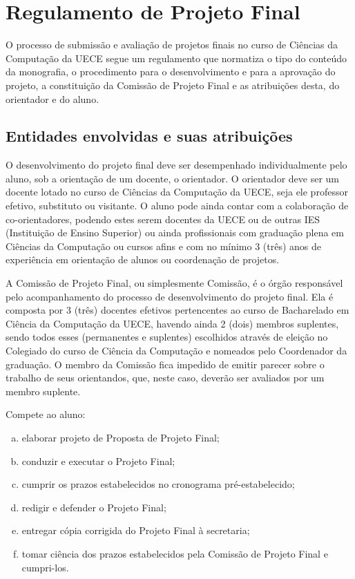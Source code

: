 \chapter{Regulamento de Projeto Final}
\label{cha:regulamento}

O processo de submissão e avaliação de projetos finais no curso
de Ciências da Computa\-ção da UECE segue um regulamento que normatiza 
o tipo do conteúdo da monografia, o procedimento para o desenvolvimento 
e para a aprovação do projeto, a constituição da Comissão de Projeto 
Final e as atribuições desta, do orientador e do aluno. 

\section{Entidades envolvidas e suas atribuições}
O desenvolvimento do projeto final deve ser desempenhado individualmente
pelo aluno, sob a orientação de um docente, o orientador. O orientador deve
ser um docente lotado no curso de Ciências da Computação da UECE, seja ele
professor efetivo, substituto ou visitante. O aluno pode ainda contar com a
colaboração de co-orientadores, podendo estes serem docentes da UECE ou de 
outras IES (Instituição de Ensino Superior) ou ainda profissionais com graduação
plena em Ciências da Computação ou cursos afins e com no mínimo 3 (três) anos
de experiência em orientação de alunos ou coordenação de projetos.

A Comissão de Projeto Final, ou simplesmente Comissão,  é o órgão 
responsável pelo acompanhamento do processo de desenvolvimento do projeto final. 
Ela é composta por 3 (três) docentes efetivos pertencentes ao curso de 
Bacharelado em Ciência da Computação da UECE, havendo ainda 2 (dois) membros 
suplentes, sendo todos esses (permanentes e suplentes) escolhidos através de 
eleição no Colegiado do curso de Ciência da Computação e nomeados pelo 
Coordenador da graduação. O membro da Comissão fica impedido de emitir 
parecer sobre o trabalho de seus orientandos, que, neste caso, 
deverão ser avaliados por um membro suplente.

Compete ao aluno:
\begin{enumerate}[a.]
\item elaborar projeto de Proposta de Projeto Final;
\item conduzir e executar o Projeto Final;
\item cumprir os prazos estabelecidos no cronograma pré-estabelecido;
\item redigir e defender o Projeto Final;
\item entregar cópia corrigida do Projeto Final à secretaria;
\item tomar ciência dos prazos estabelecidos pela Comissão de Projeto Final e cumpri-los.
\end{enumerate}

